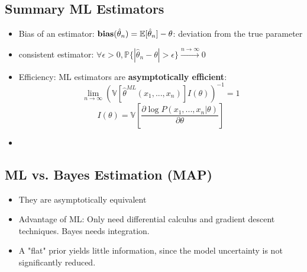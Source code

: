 \subsection{Summary ML Estimators}
\begin{itemize}
	\item Bias of an estimator: $\mathbf{bias}(\hat\theta_n) = \mathbb E[\hat\theta_n] - \theta$: deviation from the true parameter
	\item consistent estimator: $\forall\epsilon > 0, \mathbb P\{|\hat\theta_n - \theta| > \epsilon\} \xrightarrow{n\to \infty} 0$
	\item Efficiency: ML estimators are \textbf{asymptotically efficient}: 
	$$
		\lim_{n\to\infty}\left(\mathbb V[\hat\theta^{ML}(x_1, ..., x_n)]I(\theta)\right)^{-1} = 1
	$$
	$$ I(\theta) = \mathbb V\left[\frac{\partial\log P(x_1, ..., x_n|\theta)}{\partial \theta} \right]$$
	\item 
\end{itemize}

\subsection{ML vs. Bayes Estimation (MAP)}
\begin{itemize}
	\item They are asymptotically equivalent
	\item Advantage of ML: Only need differential calculus and gradient descent techniques. Bayes needs integration.
	\item A "flat" prior yields little information, since the model uncertainty is not significantly reduced.
\end{itemize}




